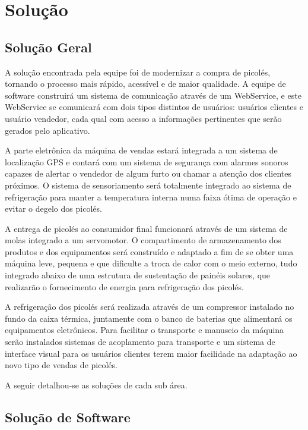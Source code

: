 \chapter{Solução}

\section{Solução Geral}

A solução encontrada pela equipe foi de modernizar a compra de picolés, tornando o processo mais rápido, acessível e de maior qualidade. A equipe de software construirá um sistema de comunicação através de um WebService, e este WebService se comunicará com dois tipos distintos de usuários: usuários clientes e usuário vendedor, cada qual com acesso a informações pertinentes que serão gerados pelo aplicativo.

A parte eletrônica da máquina de vendas estará integrada a um sistema de localização GPS e contará com um sistema de segurança com alarmes sonoros capazes de alertar o vendedor de algum furto ou chamar a atenção dos clientes próximos. O sistema de sensoriamento será totalmente integrado ao sistema de refrigeração para manter a temperatura interna numa faixa ótima de operação e evitar o degelo dos picolés. 

A entrega de picolés ao consumidor final funcionará através de um sistema de molas integrado a um servomotor. O compartimento de armazenamento dos produtos e dos equipamentos será construído e adaptado a fim de se obter uma máquina leve, pequena e que dificulte a troca de calor com o meio externo, tudo integrado abaixo de uma estrutura de sustentação de painéis solares, que realizarão o fornecimento de energia para refrigeração dos picolés.

A refrigeração dos picolés será realizada através de um compressor instalado no fundo da caixa térmica,  juntamente com o banco de baterias que alimentará os equipamentos eletrônicos. Para facilitar o transporte e manuseio da máquina serão instalados sistemas de acoplamento para transporte e um sistema de interface visual para os usuários clientes terem maior facilidade na adaptação ao novo tipo de vendas de picolés.

A seguir detalhou-se as soluções de cada sub área.


\section{Solução de Software}

